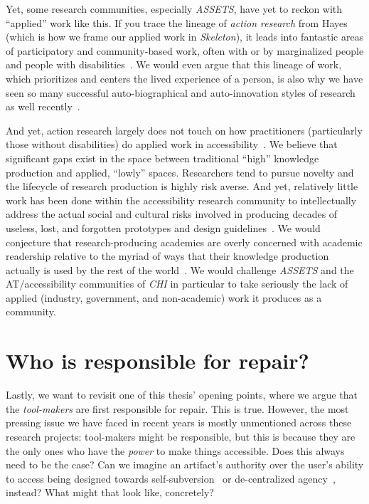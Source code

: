 \documentclass[12pt]{cmuthesis}
\begin{document}
Yet, some research communities, especially \textit{ASSETS}, have yet to reckon with ``applied'' work like this. If you trace the lineage of \textit{action research} from Hayes~\cite{Hayes2011ActionResearch} (which is how we frame our applied work in \textit{Skeleton}), it leads into fantastic areas of participatory and community-based work, often with or by marginalized people and people with disabilities~\cite{Spiel2020,Sum2024,Sum2022,To2023,Bennett2018Interdependence,Williams2023,Hsueh,Lundgard2019Sociotechnical,Mankoff2010Disability}. We would even argue that this lineage of work, which prioritizes and centers the lived experience of a person, is also why we have seen so many successful auto-biographical and auto-innovation styles of research as well recently~\cite{Seo2024,Biggs2022Audiom,Glazko2023,Williams2019,Williams2021,Gardner2023,Hofmann2020}.

And yet, action research largely does not touch on how practitioners (particularly those without disabilities) do applied work in accessibility~\cite{Joyner2022Wild,Sharif2024Challenges}. We believe that significant gaps exist in the space between traditional ``high'' knowledge production and applied, ``lowly'' spaces. Researchers tend to pursue novelty and the lifecycle of research production is highly risk averse. And yet, relatively little work has been done within the accessibility research community to intellectually address the actual social and cultural risks involved in producing decades of useless, lost, and forgotten prototypes and design guidelines~\cite{Hurst2013Making,Jackson2022}. We would conjecture that research-producing academics are overly concerned with academic readership relative to the myriad of ways that their knowledge production actually is used by the rest of the world~\cite{Mohammadi2015}. We would challenge \textit{ASSETS} and the AT/accessibility communities of \textit{CHI} in particular to take seriously the lack of applied (industry, government, and non-academic) work it produces as a community.

\section{Who is responsible for repair?}
Lastly, we want to revisit one of this thesis' opening points, where we argue that the \textit{tool-makers} are first responsible for repair. This is true. However, the most pressing issue we have faced in recent years is mostly unmentioned across these research projects: tool-makers might be responsible, but this is because they are the only ones who have the \textit{power} to make things accessible. Does this always need to be the case? Can we imagine an artifact's authority over the user's ability to access being designed towards self-subversion~\cite{Graeber2006} or de-centralized agency~\cite{Keyes2019,Mohan2000,Casey2018}, instead? What might that look like, concretely?
\end{document}
